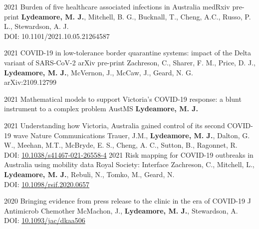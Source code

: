\documentclass[9pt]{developercv} %
\begin{document}
\begin{publist}
    \publication
        {2021}
        {Burden of five healthcare associated infections in Australia}
        {medRxiv pre-print}
        { \textbf{Lydeamore, M. J.}, Mitchell, B. G., Bucknall, T., Cheng, A.C., Russo, P. L., Stewardson, A. J. \\
        DOI: 10.1101/2021.10.05.21264587}

    \publication
        {2021}
        {COVID-19 in low-tolerance border quarantine systems: impact of the Delta variant of SARS-CoV-2}
        {arXiv pre-print}
        {Zachreson, C., Sharer, F. M., Price, D. J., \textbf{Lydeamore, M. J.}, McVernon, J., McCaw, J., Geard, N. G. \\
        arXiv:2109.12799}

    \publication
        {2021}
        {Mathematical models to support Victoria's COVID-19 response: a blunt instrument to a complex problem}
        {AustMS}
        {\textbf{Lydeamore, M. J.}}
        
    
    \publication
        {2021}
        {Understanding how Victoria, Australia gained control of its second COVID-19 wave}
        {Nature Communications}
        {Trauer, J.M., \textbf{Lydeamore, M. J.}, Dalton, G. W., Meehan, M.T., McBryde, E. S., Cheng, A. C., Sutton, B., Ragonnet, R. \\
        DOI: \href{https://doi.org/10.1038/s41467-021-26558-4}{10.1038/s41467-021-26558-4}}
    \publication
        {2021}
        {Risk mapping for COVID-19 outbreaks in Australia using mobility data}
        {Royal Society: Interface}
        {Zachreson, C., Mitchell, L., \textbf{Lydeamore, M. J.}, Rebuli, N., Tomko, M., Geard, N. \\
        DOI: \href{https://doi.org/10.1098/rsif.2020.0657}{10.1098/rsif.2020.0657}}
        
    \publication
        {2020}
        {Bringing evidence from press release to the clinic in the era of COVID-19}
        {J Antimicrob Chemother}
        {McMachon, J., \textbf{Lydeamore, M. J.}, Stewardson, A. \\
        DOI: \href{https://doi.org/10.1093/jac/dkaa506}{10.1093/jac/dkaa506}}
        

\end{publist}
\end{document}
